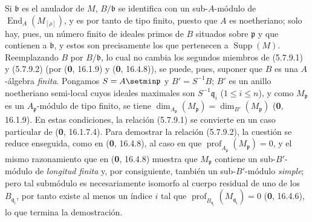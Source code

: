 Si $\mathfrak b$ es el anulador de $M$, $B/\mathfrak b$ se identifica con un
sub-$A$-módulo de $\operatorname{End}_A(M_{[\rho]})$, y es por tanto de tipo
finito, puesto que $A$ es noetheriano; solo hay, pues, un número finito de
ideales primos de $B$ situados sobre $\mathfrak p$ y que contienen a
$\mathfrak b$, y estos son precisamente los que pertenecen a
$\operatorname{Supp}(M)$. Reemplazando $B$ por $B/\mathfrak b$, lo cual no
cambia los segundos miembros de (5.7.9.1) y (5.7.9.2) (por (\textbf 0, 16.1.9) y
(\textbf 0, 16.4.8)), se puede, pues, suponer que $B$ es una $A$-álgebra \emph{finita}.
Pongamos $S=A\setmin\mathfrak p$ y $B'=S^{-1}B$; $B'$ es un anillo noetheriano
semi-local cuyos ideales maximales son $S^{-1}\mathfrak q_i$
($1\leq i\leq n$), y como $M_{\mathfrak p}$ es un
$A_{\mathfrak p}$-módulo de tipo finito, se tiene
$\dim_{A_{\mathfrak p}}(M_{\mathfrak p})=\dim_{B'}(M_{\mathfrak p})$
(\textbf 0, 16.1.9). En estas condiciones, la relación (5.7.9.1) se convierte en un
caso particular de (\textbf 0, 16.1.7.4). Para demostrar la relación (5.7.9.2), la cuestión se reduce enseguida, como en (\textbf 0, 16.4.8), al caso en que
$\operatorname{prof}_{A_{\mathfrak p}}(M_{\mathfrak p})=0$, y el mismo
razonamiento que en (\textbf 0, 16.4.8) muestra que $M_{\mathfrak p}$ contiene un
sub-$B'$-módulo de \emph{longitud finita} y, por consiguiente, también un
sub-$B'$-módulo \emph{simple}; pero tal submódulo es necesariamente isomorfo al
cuerpo residual de uno de los $B_{\mathfrak q_i}$, por tanto existe al menos
un índice $i$ tal que
$\operatorname{prof}_{B_{\mathfrak q_i}}(M_{\mathfrak q_i})=0$
(\textbf 0, 16.4.6), lo que termina la demostración.
